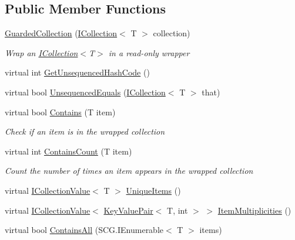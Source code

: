 \subsection*{Public Member Functions}
\begin{DoxyCompactItemize}
\item 
\hyperlink{class_c5_1_1_guarded_collection_af940d400b312c53974a6760b141a0678}{Guarded\+Collection} (\hyperlink{interface_c5_1_1_i_collection}{I\+Collection}$<$ T $>$ collection)
\begin{DoxyCompactList}\small\item\em Wrap an \hyperlink{interface_c5_1_1_i_collection}{I\+Collection}$<$T$>$ in a read-\/only wrapper \end{DoxyCompactList}\item 
virtual int \hyperlink{class_c5_1_1_guarded_collection_a993f9bfefdd11d4bf8f776215db02c31}{Get\+Unsequenced\+Hash\+Code} ()
\item 
virtual bool \hyperlink{class_c5_1_1_guarded_collection_ada1904ad7956b9e72606e2f9082642d7}{Unsequenced\+Equals} (\hyperlink{interface_c5_1_1_i_collection}{I\+Collection}$<$ T $>$ that)
\item 
virtual bool \hyperlink{class_c5_1_1_guarded_collection_a1ffdf15a3e9daa80137e53fcd642770e}{Contains} (T item)
\begin{DoxyCompactList}\small\item\em Check if an item is in the wrapped collection \end{DoxyCompactList}\item 
virtual int \hyperlink{class_c5_1_1_guarded_collection_ae5bfa7d92d0ebe7d185f04f8836685c7}{Contains\+Count} (T item)
\begin{DoxyCompactList}\small\item\em Count the number of times an item appears in the wrapped collection \end{DoxyCompactList}\item 
virtual \hyperlink{interface_c5_1_1_i_collection_value}{I\+Collection\+Value}$<$ T $>$ \hyperlink{class_c5_1_1_guarded_collection_a2a600a8efdfc23bcf87ae310cfbe8120}{Unique\+Items} ()
\item 
virtual \hyperlink{interface_c5_1_1_i_collection_value}{I\+Collection\+Value}$<$ \hyperlink{struct_c5_1_1_key_value_pair}{Key\+Value\+Pair}$<$ T, int $>$ $>$ \hyperlink{class_c5_1_1_guarded_collection_ad400f5862b15a3a0c59a4cb7d347f926}{Item\+Multiplicities} ()
\item 
virtual bool \hyperlink{class_c5_1_1_guarded_collection_a57f6d96d3787483e45837b2700d9459b}{Contains\+All} (S\+C\+G.\+I\+Enumerable$<$ T $>$ items)

\end{DoxyCompactItemize}
